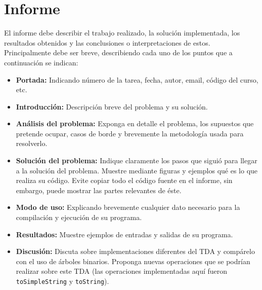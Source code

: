 \documentclass[dcc]{fcfmcourse}
\begin{document}
\section{Informe}

El informe debe describir el trabajo realizado, la solución implementada, los resultados obtenidos
y las conclusiones o interpretaciones de estos. Principalmente debe ser breve, describiendo cada uno
de los puntos que a continuación se indican:

\begin{itemize}
    \item \textbf{Portada:} Indicando número de la tarea, fecha, autor, email, código del curso, etc.
    \item \textbf{Introducción:} Descripción breve del problema y su solución.
    \item \textbf{Análisis del problema:} Exponga en detalle el problema, los supuestos que pretende ocupar, casos de borde y brevemente la metodología usada para resolverlo.
    \item \textbf{Solución del problema:} Indique claramente los pasos que siguió para llegar a la solución
del problema. Muestre mediante figuras y ejemplos qué es lo que realiza su código. Evite
copiar todo el código fuente en el informe, sin embargo, puede mostrar las partes relevantes
de éste.
\item \textbf{Modo de uso:} Explicando brevemente cualquier dato necesario para la compilación y
ejecución de su programa.
\item \textbf{Resultados:} Muestre ejemplos de entradas y salidas de su programa.
\item \textbf{Discusión:} Discuta sobre implementaciones diferentes del TDA y compárelo con el uso de árboles binarios. Proponga nuevas operaciones que se podrían realizar sobre este TDA (las operaciones implementadas aquí fueron \texttt{toSimpleString} y \texttt{toString}).
\end{itemize}
\end{document}
